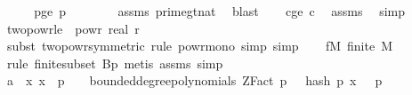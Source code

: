 \begin{isabellebody}
%
\isadelimproof
%
\endisadelimproof
%
\isatagproof
{}\isamarkupfalse%
\ {\isacharminus}{\kern0pt}\isanewline
\ \ \isamarkupfalse%
\ p{\isacharunderscore}{\kern0pt}ge{\isacharunderscore}{\kern0pt}{}{\isacharcolon}{\kern0pt}\ {\isachardoublequoteopen}p\ {\isachargreater}{\kern0pt}\ {}{\isachardoublequoteclose}\isanewline
\ \ \ \ \isamarkupfalse%
\ assms\ prime{\isacharunderscore}{\kern0pt}gt{\isacharunderscore}{\kern0pt}{}{\isacharunderscore}{\kern0pt}nat\ \isamarkupfalse%
\ blast\isanewline
\isanewline
\ \ \isamarkupfalse%
\ c{\isacharunderscore}{\kern0pt}ge{\isacharunderscore}{\kern0pt}{}{\isacharcolon}{\kern0pt}\ {\isachardoublequoteopen}c{\isasymge}{}{\isachardoublequoteclose}\ \isamarkupfalse%
\ assms\ \isamarkupfalse%
\ simp\isanewline
\ \ \isanewline
\ \ \isamarkupfalse%
\ two{\isacharunderscore}{\kern0pt}pow{\isacharunderscore}{\kern0pt}r{\isacharunderscore}{\kern0pt}le{\isacharunderscore}{\kern0pt}{}{\isacharcolon}{\kern0pt}\ {\isachardoublequoteopen}{}\ powr\ {\isacharparenleft}{\kern0pt}{\isacharminus}{\kern0pt}real\ r{\isacharparenright}{\kern0pt}\ {\isasymle}\ {}{\isachardoublequoteclose}\ \isanewline
\ \ \ \ \isamarkupfalse%
\ {\isacharparenleft}{\kern0pt}subst\ two{\isacharunderscore}{\kern0pt}powr{\isacharunderscore}{\kern0pt}{}{\isacharbrackleft}{\kern0pt}symmetric{\isacharbrackright}{\kern0pt}{\isacharcomma}{\kern0pt}\ rule\ powr{\isacharunderscore}{\kern0pt}mono{\isacharcomma}{\kern0pt}\ simp{\isacharcomma}{\kern0pt}\ simp{\isacharparenright}{\kern0pt}\isanewline
\isanewline
\ \ \isamarkupfalse%
\ f{\isacharunderscore}{\kern0pt}M{\isacharcolon}{\kern0pt}\ {\isachardoublequoteopen}finite\ M{\isachardoublequoteclose}\isanewline
\ \ \ \ \isamarkupfalse%
\ {\isacharparenleft}{\kern0pt}rule\ finite{\isacharunderscore}{\kern0pt}subset{\isacharbrackleft}{\kern0pt}\ B{\isacharequal}{\kern0pt}{\isachardoublequoteopen}{\isacharbraceleft}{\kern0pt}{}{\isachardot}{\kern0pt}{\isachardot}{\kern0pt}{\isacharless}{\kern0pt}p{\isacharbraceright}{\kern0pt}{\isachardoublequoteclose}{\isacharbrackright}{\kern0pt}{\isacharcomma}{\kern0pt}\ metis\ assms{\isacharparenleft}{\kern0pt}{}{\isacharparenright}{\kern0pt}{\isacharcomma}{\kern0pt}\ simp{\isacharparenright}{\kern0pt}\isanewline
\isanewline
\ \ \isamarkupfalse%
\ a{}{\isacharcolon}{\kern0pt}\ {\isachardoublequoteopen}{\isasymAnd}{\isasymomega}\ x{\isachardot}{\kern0pt}\ x\ {\isacharless}{\kern0pt}\ p\ {\isasymLongrightarrow}\ {\isasymomega}\ {\isasymin}\ bounded{\isacharunderscore}{\kern0pt}degree{\isacharunderscore}{\kern0pt}polynomials\ {\isacharparenleft}{\kern0pt}ZFact\ p{\isacharparenright}{\kern0pt}\ {}\ {\isasymLongrightarrow}\ hash\ p\ x\ {\isasymomega}\ {\isacharless}{\kern0pt}\ p{\isachardoublequoteclose}\ \isanewline

\end{isabellebody}
